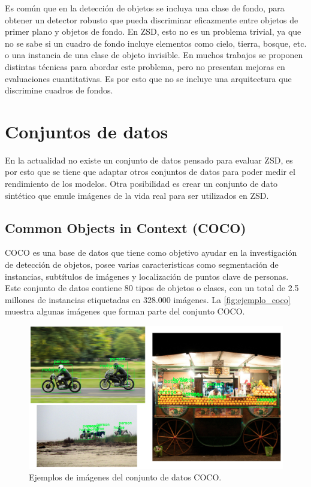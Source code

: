 Es común que en la detección de objetos se incluya una clase de fondo, para obtener un detector robusto que pueda discriminar eficazmente entre objetos de primer plano y objetos de fondo. En ZSD, esto no es un problema trivial, ya que no se sabe si un cuadro de fondo incluye elementos como cielo, tierra, bosque, etc. o una instancia de una clase de objeto invisible. En muchos trabajos se proponen distintas técnicas para abordar este problema, pero no presentan mejoras en evaluaciones cuantitativas. Es por esto que no se incluye una arquitectura que discrimine cuadros de fondos.


\section{Conjuntos de datos} \label{sec:conjuntosdedatos}

En la actualidad no existe un conjunto de datos pensado para evaluar ZSD, es por esto que se tiene que adaptar otros conjuntos de datos para poder medir el rendimiento de los modelos. Otra posibilidad es crear un conjunto de dato sintético que emule imágenes de la vida real para ser utilizados en ZSD.

\subsection{Common Objects in Context (COCO)}\label{ssec:commonobjectsincontext}

COCO es una base de datos que tiene como objetivo ayudar en la investigación de detección de objetos, posee varias caracteristicas como segmentación de instancias, subtítulos de imágenes y localización de puntos clave de personas. Este conjunto de datos contiene 80 tipos de objetos o  clases, con un total de 2.5 millones de instancias etiquetadas en 328.000 imágenes. La \autoref{fig:ejemplo_coco} muestra algunas imágenes que forman parte del conjunto COCO.

\begin{figure}
	\begin{center}
		\centering
		\includegraphics[width=1\textwidth]{img/coco_ejemplo.png}
		\caption{Ejemplos de imágenes del conjunto de datos COCO.}
		\label{fig:ejemplo_coco}
	\end{center}	
\end{figure}

